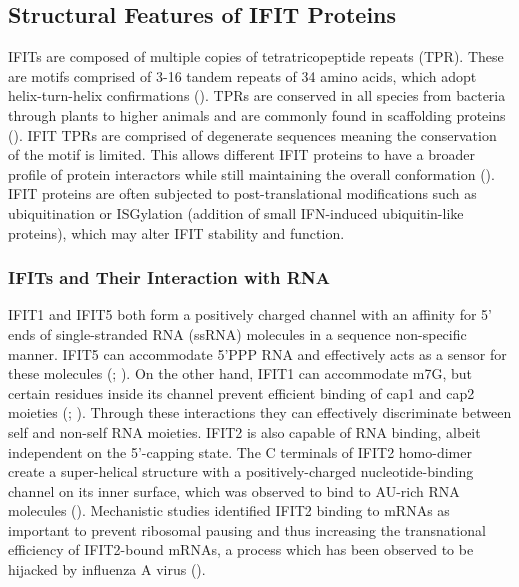 \subsection{Structural Features of IFIT Proteins} \label{subsec:Structural Features of IFIT Proteins}
IFITs are composed of multiple copies of tetratricopeptide repeats (TPR). These are motifs comprised of 3-16 tandem repeats of 34 amino acids, which adopt helix-turn-helix confirmations (\cite{DAndrea2003TPRHelix}). TPRs are conserved in all species from bacteria through plants to higher animals and are commonly found in scaffolding proteins (\cite{Vladimer2014IFITs:Proteins}). IFIT TPRs are comprised of degenerate sequences meaning the conservation of the motif is limited. This allows different IFIT proteins to have a broader profile of protein interactors while still maintaining the overall conformation (\cite{Fensterl2015Interferon-InducedPathogenesis}). IFIT proteins are often subjected to post-translational modifications such as ubiquitination or ISGylation (addition of small IFN-induced ubiquitin-like proteins), which may alter IFIT stability and function.

\subsubsection{IFITs and Their Interaction with RNA} \label{IFITs and Their Interaction with RNA}
IFIT1 and IFIT5 both form a positively charged channel with an affinity for 5' ends of single-stranded RNA (ssRNA) molecules in a sequence non-specific manner. IFIT5 can accommodate 5'PPP RNA and effectively acts as a sensor for these molecules (\cite{Abbas2013StructuralProteins}; \cite{Pichlmair2011IFIT1RNA}). On the other hand, IFIT1 can accommodate m7G, but certain residues inside its channel prevent efficient binding of cap1 and cap2 moieties (\cite{Diamond2014IFIT1:Translation}; \cite{Mears2018BetterResponse}). Through these interactions they can effectively discriminate between self and non-self RNA moieties. IFIT2 is also capable of RNA binding, albeit independent on the 5'-capping state. The C terminals of IFIT2 homo-dimer create a super-helical structure with a positively-charged nucleotide-binding channel on its inner surface, which was observed to bind to AU-rich RNA molecules (\cite{Yang2012CrystalMechanisms}). Mechanistic studies identified IFIT2 binding to mRNAs as important to prevent ribosomal pausing and thus increasing the transnational efficiency of IFIT2-bound mRNAs, a process which has been observed to be hijacked by influenza A virus (\cite{Tran2020InfluenzaMRNAs}).

